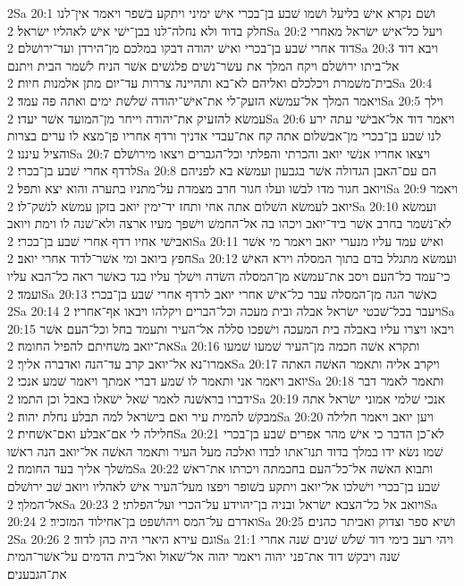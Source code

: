 2Sa 20:1  ושׁם נקרא אישׁ בליעל ושׁמו שׁבע בן־בכרי אישׁ ימיני ויתקע בשׁפר ויאמר אין־לנו חלק בדוד ולא נחלה־לנו בבן־ישׁי אישׁ לאהליו ישׂראל׃
2Sa 20:2  ויעל כל־אישׁ ישׂראל מאחרי דוד אחרי שׁבע בן־בכרי ואישׁ יהודה דבקו במלכם מן־הירדן ועד־ירושׁלם׃
2Sa 20:3  ויבא דוד אל־ביתו ירושׁלם ויקח המלך את עשׂר־נשׁים פלגשׁים אשׁר הניח לשׁמר הבית ויתנם בית־משׁמרת ויכלכלם ואליהם לא־בא ותהיינה צררות עד־יום מתן אלמנות חיות׃
2Sa 20:4  ויאמר המלך אל־עמשׂא הזעק־לי את־אישׁ־יהודה שׁלשׁת ימים ואתה פה עמד׃
2Sa 20:5  וילך עמשׂא להזעיק את־יהודה וייחר מן־המועד אשׁר יעדו׃
2Sa 20:6  ויאמר דוד אל־אבישׁי עתה ירע לנו שׁבע בן־בכרי מן־אבשׁלום אתה קח את־עבדי אדניך ורדף אחריו פן־מצא לו ערים בצרות והציל עיננו׃
2Sa 20:7  ויצאו אחריו אנשׁי יואב והכרתי והפלתי וכל־הגברים ויצאו מירושׁלם לרדף אחרי שׁבע בן־בכרי׃
2Sa 20:8  הם עם־האבן הגדולה אשׁר בגבעון ועמשׂא בא לפניהם ויואב חגור מדו לבשׁו ועלו חגור חרב מצמדת על־מתניו בתערה והוא יצא ותפל׃
2Sa 20:9  ויאמר יואב לעמשׂא השׁלום אתה אחי ותחז יד־ימין יואב בזקן עמשׂא לנשׁק־לו׃
2Sa 20:10  ועמשׂא לא־נשׁמר בחרב אשׁר ביד־יואב ויכהו בה אל־החמשׁ וישׁפך מעיו ארצה ולא־שׁנה לו וימת ויואב ואבישׁי אחיו רדף אחרי שׁבע בן־בכרי׃
2Sa 20:11  ואישׁ עמד עליו מנערי יואב ויאמר מי אשׁר חפץ ביואב ומי אשׁר־לדוד אחרי יואב׃
2Sa 20:12  ועמשׂא מתגלל בדם בתוך המסלה וירא האישׁ כי־עמד כל־העם ויסב את־עמשׂא מן־המסלה השׂדה וישׁלך עליו בגד כאשׁר ראה כל־הבא עליו ועמד׃
2Sa 20:13  כאשׁר הגה מן־המסלה עבר כל־אישׁ אחרי יואב לרדף אחרי שׁבע בן־בכרי׃
2Sa 20:14  ויעבר בכל־שׁבטי ישׂראל אבלה ובית מעכה וכל־הברים ויקלהו ויבאו אף־אחריו׃
2Sa 20:15  ויבאו ויצרו עליו באבלה בית המעכה וישׁפכו סללה אל־העיר ותעמד בחל וכל־העם אשׁר את־יואב משׁחיתם להפיל החומה׃
2Sa 20:16  ותקרא אשׁה חכמה מן־העיר שׁמעו שׁמעו אמרו־נא אל־יואב קרב עד־הנה ואדברה אליך׃
2Sa 20:17  ויקרב אליה ותאמר האשׁה האתה יואב ויאמר אני ותאמר לו שׁמע דברי אמתך ויאמר שׁמע אנכי׃
2Sa 20:18  ותאמר לאמר דבר ידברו בראשׁנה לאמר שׁאל ישׁאלו באבל וכן התמו׃
2Sa 20:19  אנכי שׁלמי אמוני ישׂראל אתה מבקשׁ להמית עיר ואם בישׂראל למה תבלע נחלת יהוה׃
2Sa 20:20  ויען יואב ויאמר חלילה חלילה לי אם־אבלע ואם־אשׁחית׃
2Sa 20:21  לא־כן הדבר כי אישׁ מהר אפרים שׁבע בן־בכרי שׁמו נשׂא ידו במלך בדוד תנו־אתו לבדו ואלכה מעל העיר ותאמר האשׁה אל־יואב הנה ראשׁו משׁלך אליך בעד החומה׃
2Sa 20:22  ותבוא האשׁה אל־כל־העם בחכמתה ויכרתו את־ראשׁ שׁבע בן־בכרי וישׁלכו אל־יואב ויתקע בשׁופר ויפצו מעל־העיר אישׁ לאהליו ויואב שׁב ירושׁלם אל־המלך׃
2Sa 20:23  ויואב אל כל־הצבא ישׂראל ובניה בן־יהוידע על־הכרי ועל־הפלתי׃
2Sa 20:24  ואדרם על־המס ויהושׁפט בן־אחילוד המזכיר׃
2Sa 20:25  ושׁיא ספר וצדוק ואביתר כהנים׃
2Sa 20:26  וגם עירא היארי היה כהן לדוד׃
2Sa 21:1  ויהי רעב בימי דוד שׁלשׁ שׁנים שׁנה אחרי שׁנה ויבקשׁ דוד את־פני יהוה ויאמר יהוה אל־שׁאול ואל־בית הדמים על־אשׁר־המית את־הגבענים׃

